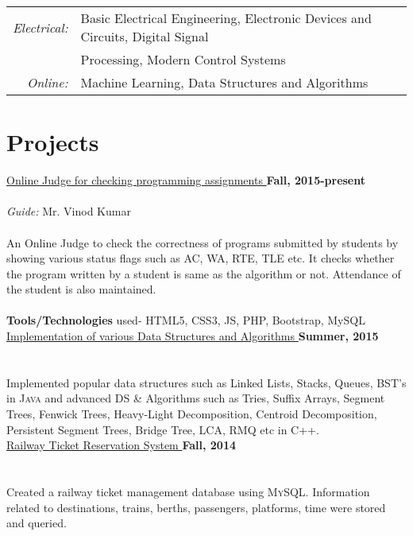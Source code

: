 \documentclass[margin,line]{res}
\begin{document}
\begin{resume}
\begin{tabular}{rlp{5cm}}
\em{Electrical:} & Basic Electrical Engineering, Electronic Devices and Circuits, Digital Signal
\\ & Processing, Modern Control Systems \\

\em{Online:} & Machine Learning, Data Structures and Algorithms\\
\end{tabular}

\section{\sc Projects}

\underline{\sc Online Judge for checking programming assignments } \hfill {\bf Fall, 2015-present}\\\\
{\em Guide:} Mr. Vinod Kumar \\
\\An Online Judge to check the correctness of programs submitted by students by showing various status flags such as AC, WA, RTE, TLE etc. It checks whether the program written by a student is same as the algorithm or not. Attendance of the student is also maintained.\\
\\ {\bf Tools/Technologies} used- HTML5, CSS3, JS, PHP, Bootstrap, MySQL \\

\underline{\sc Implementation of various Data Structures and Algorithms } \hfill {\bf Summer, 2015}\\\\
\\ Implemented popular data structures such as Linked Lists, Stacks, Queues, BST's in \textsc{Java} and advanced DS \& Algorithms such as Tries, Suffix Arrays, Segment Trees, Fenwick Trees, Heavy-Light Decomposition, Centroid Decomposition, Persistent Segment Trees, Bridge Tree, LCA, RMQ etc in \textsc{C++}.\\ 

\underline{\sc Railway Ticket Reservation System } \hfill {\bf Fall, 2014 }\\\\
\\Created a railway ticket management database using \textsc{MySQL}. Information related to destinations, trains, berths, passengers, platforms, time were stored and queried.\\


\end{resume}
\end{document}
